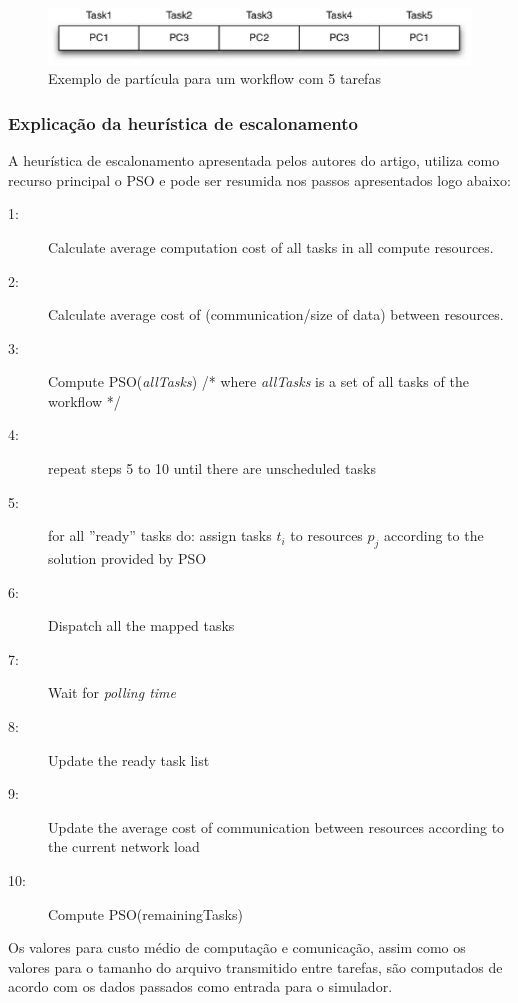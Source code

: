 \documentclass[a4paper,10pt]{article}
\begin{document}
\begin{figure}[!htb]
\centering
\includegraphics[scale=.5]{figures/fig1.eps}
\caption{Exemplo de partícula para um workflow com 5 tarefas}
\label{particula}
\end{figure}

\subsubsection{Explicação da heurística de escalonamento}

A heurística de escalonamento apresentada pelos autores do artigo, utiliza como recurso principal o PSO e pode ser resumida nos passos
apresentados logo abaixo:\\

\begin{description}
\item[1:] Calculate average computation cost of all tasks in all compute resources.
\item[2:] Calculate average cost of (communication/size of data) between resources.
\item[3:] Compute PSO(\emph{allTasks}) /* where \emph{allTasks} is a set of all tasks of the workflow */
\item[4:] repeat steps 5 to 10 until there are unscheduled tasks
\item[5:] for all ''ready'' tasks do: assign tasks $t_{i}$ to resources $p_{j}$ according to the solution provided by PSO
\item[6:] Dispatch all the mapped tasks
\item[7:] Wait for \emph{polling time}
\item[8:] Update the ready task list
\item[9:] Update the average cost of communication between resources according to the current network load
\item[10:] Compute PSO(remainingTasks)
\end{description}

Os valores para custo médio de computação e comunicação, assim como os valores para o tamanho 
do arquivo transmitido entre tarefas, são computados de acordo com os dados passados como entrada para o simulador.\\
\end{document}
